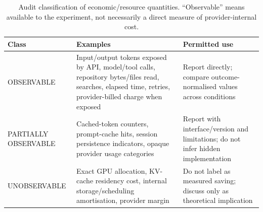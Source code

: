 \begin{table}[htbp]
\centering
\small
\caption{Audit classification of economic/resource quantities. “Observable” means available to the experiment, not necessarily a direct measure of provider-internal cost.}
\label{tab:cost-observability}
\begin{tabularx}{\textwidth}{@{}lX X@{}}
\toprule
Class & Examples & Permitted use \\
\midrule
OBSERVABLE & Input/output tokens exposed by API, model/tool calls, repository bytes/files read, searches, elapsed time, retries, provider-billed charge when exposed & Report directly; compare outcome-normalised values across conditions \\
PARTIALLY OBSERVABLE & Cached-token counters, prompt-cache hits, session persistence indicators, opaque provider usage categories & Report with interface/version and limitations; do not infer hidden implementation \\
UNOBSERVABLE & Exact GPU allocation, KV-cache residency cost, internal storage/scheduling amortisation, provider margin & Do not label as measured saving; discuss only as theoretical implication \\
\bottomrule
\end{tabularx}
\end{table}
